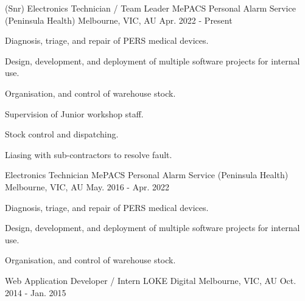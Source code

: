

\begin{cventries}

  \cventry
    {(Snr) Electronics Technician / Team Leader} %
    {MePACS Personal Alarm Service (Peninsula Health)} %
    {Melbourne, VIC, AU} %
    {Apr. 2022 - Present} %
    {
      \begin{cvitems} %
        \item {Diagnosis, triage, and repair of PERS medical devices.}
        \item {Design, development, and deployment of multiple software projects for internal use.}
        \item {Organisation, and control of warehouse stock.}
        \item {Supervision of Junior workshop staff.}
        \item {Stock control and dispatching.}
        \item {Liasing with sub-contractors to resolve fault.}
      \end{cvitems}
    }
  \cventry
    {Electronics Technician} %
    {MePACS Personal Alarm Service (Peninsula Health)} %
    {Melbourne, VIC, AU} %
    {May. 2016 - Apr. 2022} %
    {
      \begin{cvitems} %
        \item {Diagnosis, triage, and repair of PERS medical devices.}
        \item {Design, development, and deployment of multiple software projects for internal use.}
        \item {Organisation, and control of warehouse stock.}
      \end{cvitems}
    }
  \cventry
    {Web Application Developer / Intern} %
    {LOKE Digital} %
    {Melbourne, VIC, AU} %
    {Oct. 2014 - Jan. 2015} %
    {
      \begin{cvitems} %

\end{cvitems}}
\end{cventries}
